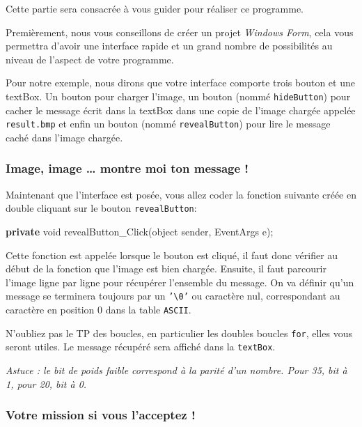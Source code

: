 \documentclass[11pt, a4paper]{article}
\newenvironment{Shaded}{}{}
\newcommand{\KeywordTok}[1]{\textcolor[rgb]{0.00,0.44,0.13}{\textbf{{#1}}}}
\newcommand{\DataTypeTok}[1]{\textcolor[rgb]{0.56,0.13,0.00}{{#1}}}
\newcommand{\FunctionTok}[1]{\textcolor[rgb]{0.02,0.16,0.49}{{#1}}}
\newcommand{\NormalTok}[1]{{#1}}
\begin{document}
Cette partie sera consacrée à vous guider pour réaliser ce programme.

Premièrement, nous vous conseillons de créer un projet \emph{Windows
Form}, cela vous permettra d'avoir une interface rapide et un grand
nombre de possibilités au niveau de l'aspect de votre programme.

Pour notre exemple, nous dirons que votre interface comporte trois
bouton et une textBox. Un bouton pour charger l'image, un bouton (nommé
\texttt{hideButton}) pour cacher le message écrit dans la textBox dans
une copie de l'image chargée appelée \texttt{result.bmp} et enfin un
bouton (nommé \texttt{revealButton}) pour lire le message caché dans
l'image chargée.

\subsubsection{Image, image \ldots{} montre moi ton message
!}\label{image-image-montre-moi-ton-message}

Maintenant que l'interface est posée, vous allez coder la fonction
suivante créée en double cliquant sur le bouton \texttt{revealButton}:

\begin{Shaded}
\begin{Highlighting}[]
\KeywordTok{private} \DataTypeTok{void} \FunctionTok{revealButton_Click}\NormalTok{(}\DataTypeTok{object} \NormalTok{sender, EventArgs e);}
\end{Highlighting}
\end{Shaded}

Cette fonction est appelée lorsque le bouton est cliqué, il faut donc
vérifier au début de la fonction que l'image est bien chargée. Ensuite,
il faut parcourir l'image ligne par ligne pour récupérer l'ensemble du
message. On va définir qu'un message se terminera toujours par un
\texttt{'\textbackslash{}0'} ou caractère nul, correspondant au
caractère en position 0 dans la table \texttt{ASCII}.

N'oubliez pas le TP des boucles, en particulier les doubles boucles
\texttt{for}, elles vous seront utiles. Le message récupéré sera affiché
dans la \texttt{textBox}.

\textit{Astuce : le bit de poids faible correspond à la parité d'un nombre. Pour 35, bit à 1, pour 20, bit à 0.}

\subsubsection{Votre mission si vous l'acceptez
!}\label{votre-mission-si-vous-lacceptez}
\end{document}
